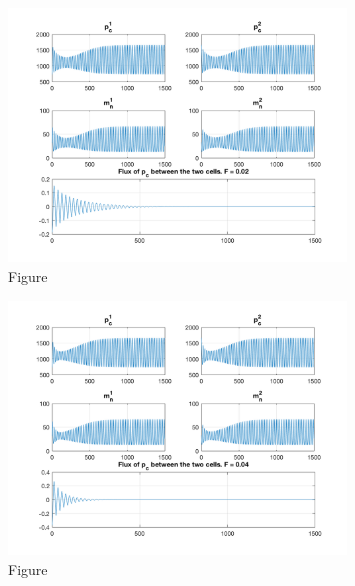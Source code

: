 \documentclass[12pt]{article}
\renewcommand{\(}{\left (}
\renewcommand{\)}{\right )}
\begin{document}
\begin{figure}[ht]
    \centering
	\begin{minipage}{0.99\textwidth}
		\centering
		\includegraphics[width=0.8\textwidth]{two_cell_same_period_diff_states_F02.png}
		\caption*{\small Figure}
	\end{minipage}
\end{figure}

\begin{figure}[ht]
    \centering
	\begin{minipage}{0.99\textwidth}
		\centering
		\includegraphics[width=0.8\textwidth]{two_cell_same_period_diff_states_F04.png}
		\caption*{\small Figure}
	\end{minipage}
\end{figure}
\end{document}
